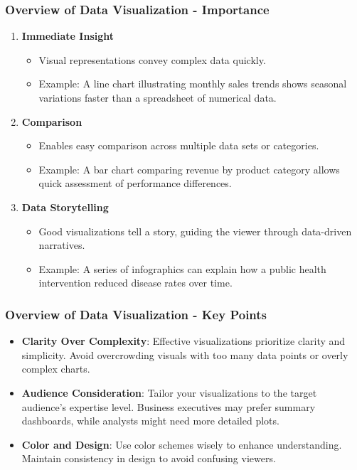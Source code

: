 \documentclass{beamer}
\begin{document}
\begin{frame}[fragile]
    \frametitle{Overview of Data Visualization - Importance}
    \begin{enumerate}
        \item \textbf{Immediate Insight}
            \begin{itemize}
                \item Visual representations convey complex data quickly.
                \item Example: A line chart illustrating monthly sales trends shows seasonal variations faster than a spreadsheet of numerical data.
            \end{itemize}
        \item \textbf{Comparison}
            \begin{itemize}
                \item Enables easy comparison across multiple data sets or categories.
                \item Example: A bar chart comparing revenue by product category allows quick assessment of performance differences.
            \end{itemize}
        \item \textbf{Data Storytelling}
            \begin{itemize}
                \item Good visualizations tell a story, guiding the viewer through data-driven narratives. 
                \item Example: A series of infographics can explain how a public health intervention reduced disease rates over time.
            \end{itemize}
    \end{enumerate}
\end{frame}

\begin{frame}[fragile]
    \frametitle{Overview of Data Visualization - Key Points}
    \begin{itemize}
        \item \textbf{Clarity Over Complexity}: 
            Effective visualizations prioritize clarity and simplicity. Avoid overcrowding visuals with too many data points or overly complex charts.
        \item \textbf{Audience Consideration}: 
            Tailor your visualizations to the target audience's expertise level. Business executives may prefer summary dashboards, while analysts might need more detailed plots.
        \item \textbf{Color and Design}: 
            Use color schemes wisely to enhance understanding. Maintain consistency in design to avoid confusing viewers.
    \end{itemize}
\end{frame}
\end{document}
